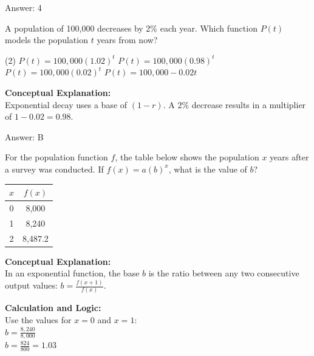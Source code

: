 \documentclass[11pt,paper=a4,answers]{exam}
\begin{document}
\begin{questions}
\begin{solution}
\vspace{25pt}

Answer: \colorbox{yellow!100}{4}
\end{solution}

\vspace{40pt}

\question
A population of 100,000 decreases by 2\% each year. Which function $P(t)$ models the population $t$ years from now?
\begin{tasks}(2)
    \task $P(t) = 100,000(1.02)^t$
    \task $P(t) = 100,000(0.98)^t$
    \task $P(t) = 100,000(0.02)^t$
    \task $P(t) = 100,000 - 0.02t$
\end{tasks}

\begin{solution}
\textbf{Conceptual Explanation:} \\
Exponential decay uses a base of $(1 - r)$. A 2\% decrease results in a multiplier of $1 - 0.02 = 0.98$.

\vspace{25pt}

Answer: \colorbox{yellow!100}{B}
\end{solution}

\vspace{40pt}

\question
For the population function $f$, the table below shows the population $x$ years after a survey was conducted. If $f(x) = a(b)^x$, what is the value of $b$?
\begin{center}
\begin{tabular}{|c|c|}
\hline
$x$ & $f(x)$ \\ \hline
0 & 8,000 \\ \hline
1 & 8,240 \\ \hline
2 & 8,487.2 \\ \hline
\end{tabular}
\end{center}

\begin{solution}
\textbf{Conceptual Explanation:} \\
In an exponential function, the base $b$ is the ratio between any two consecutive output values: $b = \frac{f(x+1)}{f(x)}$.

\vspace{20pt}

\textbf{Calculation and Logic:} \\
Use the values for $x=0$ and $x=1$: \\
$b = \frac{8,240}{8,000}$ \\
$b = \frac{824}{800} = 1.03$


\end{solution}
\end{questions}
\end{document}
